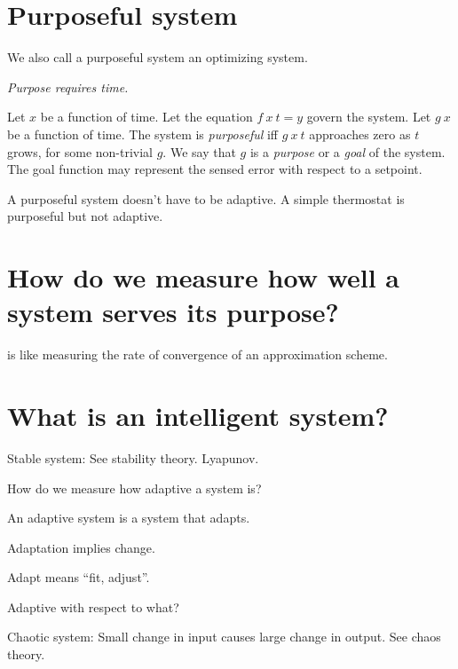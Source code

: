 \section{Purposeful system}

We also call a purposeful system an optimizing system.

\emph{Purpose requires time.}

Let \(x\) be a function of time.
Let the equation \(f~x~t = y\) govern the system.
Let \(g~x\) be a function of time.
The system is \emph{purposeful} iff \(g~x~t\) approaches zero as \(t\) grows,
for some non-trivial \(g\).
We say that \(g\) is a \emph{purpose} or a \emph{goal} of the system.
The goal function may represent the sensed error
with respect to a setpoint.

A purposeful system doesn't have to be adaptive.
A simple thermostat is purposeful but not adaptive.

\section{How do we measure how well a system serves its purpose?}

is like measuring the rate of convergence of an approximation scheme.

\section{What is an intelligent system?}

Stable system:
See stability theory.
Lyapunov.

How do we measure how adaptive a system is?

An adaptive system is a system that adapts.

Adaptation implies change.

Adapt means ``fit, adjust''.


Adaptive with respect to what?

Chaotic system:
Small change in input causes large change in output.
See chaos theory.
